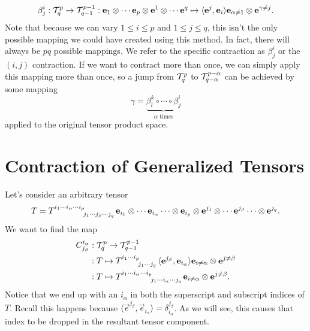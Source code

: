\[ \beta^i_j : \mathcal{T}^p_q \to \mathcal{T}^{p-1}_{q-1} : \vb{e}_1 \otimes \cdots \vb{e}_p \otimes \vb{e}^1 \otimes \cdots \vb{e}^q \mapsto \langle \vb{e}^j, \vb{e}_i \rangle \vb{e}_{\alpha \not=1}\otimes \vb{e}^{\gamma \not= j}. \]
Note that because we can vary $1 \leq i \leq p$ and $1 \leq j \leq q$, this isn't the only possible mapping we could have created using this method.
In fact, there will always be $pq$ possible mappings.
We refer to the specific contraction as $\beta^i_j$ or the $(i,j)$ contraction.
If we want to contract more than once, we can simply apply this mapping more than once, so a jump from $\mathcal{T}^p_q$ to $\mathcal{T}^{p-\alpha}_{q-\alpha}$ can be achieved by some mapping
\[ \gamma = \underbrace{\beta^{k}_{l} \circ \cdots \circ \beta^i_j}_{\text{$\alpha$ times}} \]
applied to the original tensor product space.

\section{Contraction of Generalized Tensors}
Let's consider an arbitrary tensor 
\[
T = \tensor{T}{^{i_1\cdots i_\alpha \cdots i_p}_{j_1 \cdots j_\beta \cdots j_q}} \vec{e}_{i_1} \otimes \cdots \vec{e}_{i_\alpha} \cdots \otimes \vec{e}_{i_p} \otimes \vec{e}^{j_1} \otimes \cdots \vec{e}^{j_\beta} \cdots \otimes \vec{e}^{j_q}.
\]
We want to find the map 
\begin{align*}
C^{i_\alpha}_{j_\beta} &: \tps{T}^p_q \to \tps{T}^{p-1}_{q-1} \\ 
                       &: T \mapsto \tensor{T}{^{i_1 \cdots i_p}_{j_1 \cdots j_q}} \langle \vec{e}^{j_\beta}, \vec{e}_{i_\alpha} \rangle \vec{e}_{i \not= \alpha } \otimes \vec{e}^{j \not= \beta} \\
                       &: T \mapsto \tensor{T}{^{i_1\cdots i_\alpha \cdots i_p}_{j_1\cdots i_\alpha \cdots j_q}} \vec{e}_{i \not= \alpha } \otimes \vec{e}^{j \not= \beta}.
\end{align*}
Notice that we end up with an $i_\alpha$ in both the superscript and subscript indices of $T$.
Recall this happens because $\langle \vec{e}^{j_\beta}, \vec{e}_{i_\alpha} \rangle = \delta^{j_\beta}_{i_\alpha}$.
As we will see, this causes that index to be dropped in the resultant tensor component.

